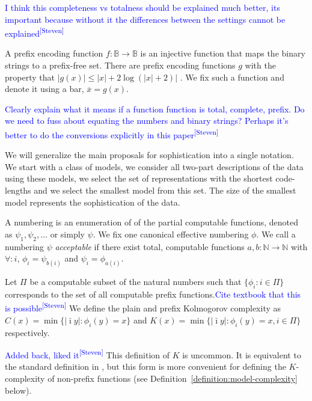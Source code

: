 \documentclass{style/llncs}
\newcommand{\B}{\mathbb B}
\newcommand{\N}{\mathbb N}
\newcommand{\br}[1]{\overline{#1}}
\newcommand{\sdr}[1]{\textcolor{blue}{\small #1\textsuperscript{[Steven]} }}
\begin{document}
\sdr{I think this completeness vs totalness should be explained much better, its important because without it the differences between the settings cannot be explained}

\begin{definition}[Numberings]

\begin{definition}
  A prefix encoding function $f:\B\to\B$ is an injective
  function that maps the binary strings to a prefix-free set. There
  are prefix encoding functions $g$ with the property that
  $|g(x)|\le|x|+2\log(|x|+2)|$ \cite{li1993introduction}. We fix such a function and
  denote it using a bar, $\br{x}=g(x)$.
\end{definition}

\sdr{Clearly explain what it means if a function function is total, complete, prefix. Do we need to fuss about equating the numbers and binary strings? Perhaps it's better to do the conversions explicitly in this paper}

We will generalize the main proposals for sophistication into a single notation. We start with a class of models, we consider all two-part descriptions of the data using these models, we select the set of representations with the shortest code-lengths and we select the smallest model from this set. The size of the smallest model represents the sophistication of the data.

A numbering is an enumeration of of the partial computable functions, denoted as $\psi_1, \psi_2, \ldots$ or simply $\psi$. We fix one canonical effective numbering $\phi$. We call a numbering $\psi$ \emph{acceptable} if there exist total, computable functions $a, b: \N \to \N$ with $\forall: i$, $\phi_i = \psi_{b(i)}$ and  $\psi_i = \phi_{a(i)}$.
\end{definition}

\begin{definition}[Complexity]
Let $\Pi$ be a computable subset of the natural numbers such that  $\{\phi_i:i\in\Pi\}$ corresponds to the set of all computable prefix functions.\sdr{Cite textbook that this is possible} We define the plain and prefix Kolmogorov complexity as $C(x)=\min\{|\bar\imath y|:\phi_i(y)=x\}$ and $K(x)=\min\{|\bar\imath y|:\phi_i(y)=x, i\in\Pi\}$ respectively.
\label{definition:complexity}
\end{definition}
\sdr{Added back, liked it} This definition of $K$ is uncommon. It is equivalent to the standard definition in \cite{li1993introduction}, but this form is more convenient for defining the $K$-complexity of non-prefix functions (see Definition~\ref{definition:model-complexity} below).
\end{document}
